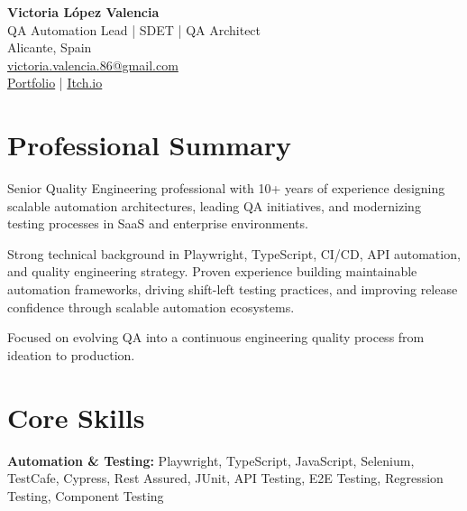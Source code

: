 \documentclass[11pt,a4paper]{article}
\begin{document}

\begin{center}

{\Huge \textbf{Victoria López Valencia}} \\[6pt]

{\large QA Automation Lead | SDET | QA Architect} \\[10pt]

Alicante, Spain \\
\href{mailto:victoria.valencia.86@gmail.com}{victoria.valencia.86@gmail.com} \\
\href{https://pikyvictoria.github.io/}{Portfolio} \quad | \quad
\href{https://victoriavalencia86.itch.io/}{Itch.io}

\end{center}

\vspace{0.5cm}


\section*{Professional Summary}

Senior Quality Engineering professional with 10+ years of experience designing scalable automation architectures, leading QA initiatives, and modernizing testing processes in SaaS and enterprise environments.

Strong technical background in Playwright, TypeScript, CI/CD, API automation, and quality engineering strategy. Proven experience building maintainable automation frameworks, driving shift-left testing practices, and improving release confidence through scalable automation ecosystems.

Focused on evolving QA into a continuous engineering quality process from ideation to production.


\section*{Core Skills}

\textbf{Automation \& Testing:}
Playwright, TypeScript, JavaScript, Selenium, TestCafe, Cypress, Rest Assured, JUnit, API Testing, E2E Testing, Regression Testing, Component Testing
\end{document}
